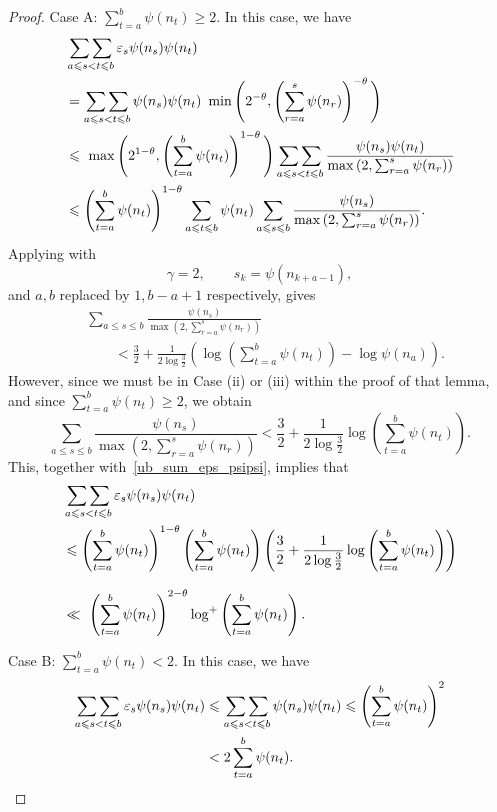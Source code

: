 \documentclass[12pt, reqno]{amsart}
\theoremstyle{definition}
\theoremstyle{remark}
\numberwithin{equation}{section}
\def\le{\leqslant} \def\ge{\geqslant}
\def\leq{\leqslant}
\def\geq{\geqslant}
\begin{document}
\begin{proof}
\noindent Case A: $\sum\limits_{t=a}^{b}\psi(n_t)\geq 2 $. In this case, we have
\begin{align}
\notag
&\mathop{\sum\sum}\limits_{a\leq s<t\leq b} \varepsilon_s\psi(n_s)\psi(n_t) \\
\notag
&= \mathop{\sum\sum}\limits_{a\leq s<t\leq b} \psi(n_s)\psi(n_t)\ \min\Bigg(2^{-\theta}, \left(  \sum_{r=a}^{s}\psi(n_r)
\right)^{-\theta} \Bigg) \\ 
\notag
&\leq \
\max\Bigg(2^{1-\theta},\left(\sum_{t=a}^b\psi(n_t) \right)^{1-\theta}\Bigg)\mathop{\sum\sum}\limits_{a\leq s<t\leq b}\frac{\psi(n_s)\psi(n_t)}{\max\left(2, \sum_{r=a}^{s}\psi(n_r) \right)} \\
\label{ub_sum_eps_psipsi} &\leq 
\left(\sum_{t=a}^b\psi(n_t) \right)^{1-\theta}\sum_{a\leq t\leq b}\psi(n_t)\sum_{a\leq s\leq b} \frac{\psi(n_s)}{\max\left(2, \sum_{r=a}^{s}\psi(n_r) \right)}.
\end{align}
Applying \cite[Lemma~D2]{PVZZ2022} with 
\[
\gamma = 2,
\qquad
s_k = \psi(n_{k+a-1}),
\]
and $a,b$ replaced by $1,b-a+1$ respectively, gives
\begin{align*}
&\sum_{a\leq s\leq b} \frac{\psi(n_s)}{\max\left(2, \sum_{r=a}^{s}\psi(n_r) \right)} \\
&\qquad <
\frac32 + \frac{1}{2\log\frac32} \left(
\log \left(\sum_{t=a}^b\psi(n_t) \right) - \log \psi(n_a) \right).
\end{align*}
However, since we must be in Case (ii) or (iii) within the proof of that lemma, and since $\sum_{t=a}^b \psi(n_t) \ge 2$, we obtain
\[
\sum_{a\leq s\leq b} \frac{\psi(n_s)}{\max\left(2, \sum_{r=a}^{s}\psi(n_r) \right)} <
\frac32 + \frac{1}{2\log\frac32}\log \left(\sum_{t=a}^b\psi(n_t) \right).
\]
This, together with~\eqref{ub_sum_eps_psipsi}, implies that
\begin{align} 
\notag
&\mathop{\sum\sum}\limits_{a\leq s<t\leq b} \varepsilon_s\psi(n_s)\psi(n_t) \\
\notag
&\leq \left(\sum_{t=a}^b\psi(n_t) \right)^{1-\theta}\left(\sum_{t=a}^b\psi(n_t) \right)\left(\frac32 + \frac{1}{2\log\frac32} \log \left(\sum_{t=a}^b\psi(n_t) \right)\right)\\[2ex]
\label{ub_sum_eps_psipsi_2}
&\ll \ \left( \sum_{t=a}^b\psi(n_t)
\right)^{2-\theta}
\log^+ \left( \sum_{t=a}^b\psi(n_t) \right).
\end{align}

\medskip

\noindent Case B:  $\sum\limits_{t=a}^{b}\psi(n_t)<2$. In this case, we have
\begin{align}
\notag
\mathop{\sum\sum}
\limits_{a\leq s<t\leq b} \varepsilon_s\psi(n_s)\psi(n_t)
&\leq \mathop{\sum\sum}
\limits_{a \leq s < t \leq b} \psi(n_s) \psi(n_t)
\le \left(\sum_{t=a}^b\psi(n_t)\right)^2 \\
\label{ub_sum_eps_psipsi_simple}
&< 2\sum_{t=a}^b\psi(n_t).
\end{align}


\end{proof}
\end{document}
